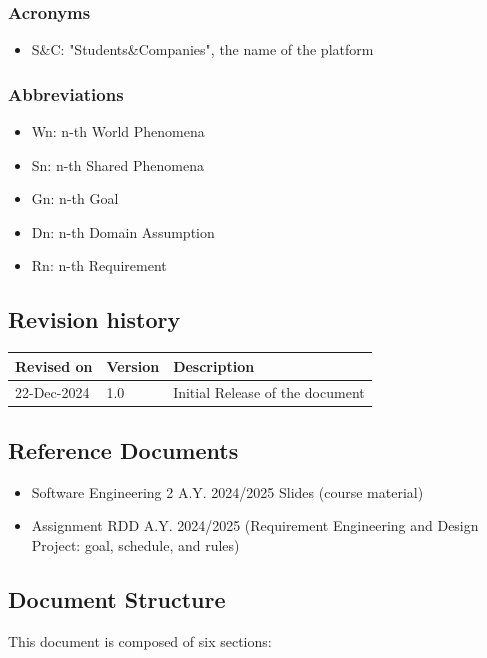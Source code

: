 \documentclass[a4paper,12pt]{article}
\begin{document}
\subsubsection{Acronyms}
    \begin{itemize}
        \item S\&C: "Students\&Companies", the name of the platform
    \end{itemize}
\subsubsection{Abbreviations}
    \begin{itemize}
        \item Wn: n-th World Phenomena
        \item Sn: n-th Shared Phenomena
        \item Gn: n-th Goal
        \item Dn: n-th Domain Assumption
        \item Rn: n-th Requirement
    \end{itemize}
\subsection{Revision history}
\noindent
\begin{tabularx}{\textwidth}{llX}
    \toprule
    Revised on & Version & Description \\
    \midrule
    22-Dec-2024 & 1.0 & Initial Release of the document \\
    \bottomrule
\end{tabularx}
\vspace{0.33pt}
\subsection{Reference Documents}
    \begin{itemize}
        \item Software Engineering 2 A.Y. 2024/2025 Slides (course material)
        \item Assignment RDD A.Y. 2024/2025 (Requirement Engineering and Design Project: goal, schedule, and rules)
    \end{itemize}

\subsection{Document Structure}
    This document is composed of six sections:
\end{document}
